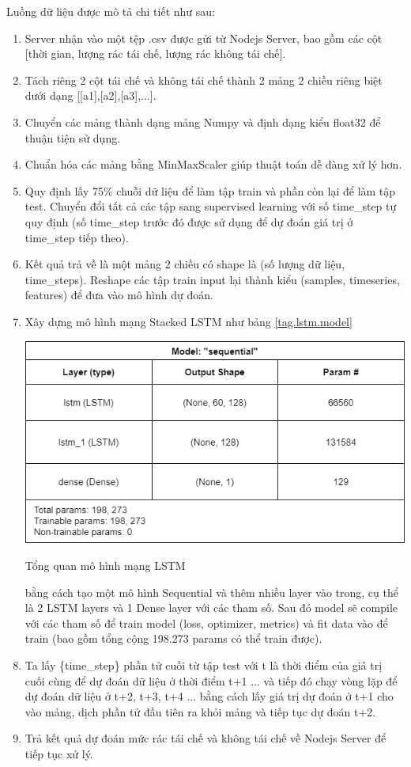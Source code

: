 Luồng dữ liệu được mô tả chi tiết như sau:

\begin{enumerate}
    \item Server nhận vào một tệp .csv được gửi từ Nodejs Server, bao gồm các cột [thời gian, lượng rác tái chế, lượng rác không tái chế]. 
    \item Tách riêng 2 cột tái chế và không tái chế thành 2 mảng 2 chiều riêng biệt dưới dạng [[a1],[a2],[a3],...].
    \item Chuyển các mảng thành dạng mảng Numpy và định dạng kiểu float32 để thuận tiện sử dụng.
    \item Chuẩn hóa các mảng bằng MinMaxScaler giúp thuật toán dễ dàng xử lý hơn.
    \item Quy định lấy 75\% chuỗi dữ liệu để làm tập train và phần còn lại để làm tập test. Chuyển đổi tất cả các tập sang supervised learning với số time\_step tự quy định (số time\_step trước đó được sử dụng để dự đoán giá trị ở time\_step tiếp theo).
    \item Kết quả trả về là một mảng 2 chiều có shape là (số lượng dữ liệu, time\_steps). Reshape các tập train input lại thành kiểu (samples, timeseries, features) để đưa vào mô hình dự đoán.
    \item Xây dựng mô hình mạng Stacked LSTM như bảng \ref{tag.lstm.model}
    \begin{table}[H]
        \centering
        \includegraphics[width=\textwidth]{images/Khanh/Python/LSTM Model.PNG}
        \caption{Tổng quan mô hình mạng LSTM}
        \label{tag.lstm.model}
    \end{table}
    bằng cách tạo một mô hình Sequential và thêm nhiều layer vào trong, cụ thể là 2 LSTM layers và 1 Dense layer với các tham số. Sau đó model sẽ compile với các tham số để train model (loss, optimizer, metrics) và fit data vào để train (bao gồm tổng cộng 198.273 params có thể train được).
    \item Ta lấy \{time\_step\} phần tử cuối từ tập test với t là thời điểm của giá trị cuối cùng để dự đoán dữ liệu ở thời điểm t+1 ... và tiếp đó chạy vòng lặp để dự đoán dữ liệu ở t+2, t+3, t+4 ... bằng cách lấy giá trị dự đoán ở t+1 cho vào mảng, dịch phần tử đầu tiên ra khỏi mảng và tiếp tục dự đoán t+2.
    \item Trả kết quả dự đoán mức rác tái chế và không tái chế về Nodejs Server để tiếp tục xử lý. 
\end{enumerate}

